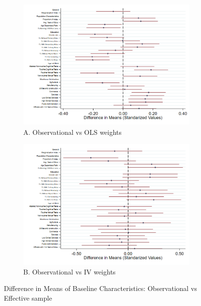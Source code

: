 \documentclass[dv_diss_main.tex]{subfiles}
\begin{document}
\begin{figure}[H] 
		\centering 
		
		\begin{subfigure}[t]{0.77\textwidth} 
			\centering
			\includegraphics[width=\linewidth]{figures/obs_res_ols_sc_tr.png}
			\caption*{\footnotesize A. Observational vs OLS weights} 
		\end{subfigure} 
	\vspace{0.1cm} %
		\begin{subfigure}[t]{0.77\textwidth} 
			\centering
			\includegraphics[width=\linewidth]{figures/obs_res_cf_sc_tr.png}
			\caption*{\footnotesize B. Observational vs IV weights} 
		\end{subfigure}
		\caption{Difference in Means of Baseline Characteristics: Observational vs Effective sample}\label{fig:late}
	
		\parbox{\textwidth}{\small 
			\vspace{2eX}
			\footnotesize	
			\sammi
		}
\end{figure}
\end{document}
